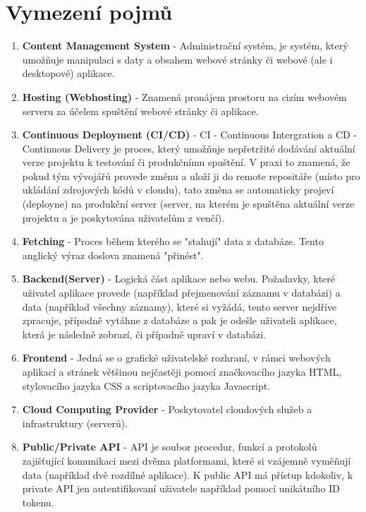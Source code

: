\documentclass[12pt,a4paper]{report}
\begin{document}
  \clearpage
  
  \tableofcontents
  
  \clearpage

  \chapter{Vymezení pojmů}
  \begin{enumerate}
    \item \textbf{Content Management System} - Administrační systém, je systém, který umožňuje manipulaci s daty a obsahem webové stránky či webové (ale i desktopové) aplikace. 
    \item \textbf{Hosting (Webhosting)} - Znamená pronájem prostoru na cizím webovém serveru za účelem spuštění webové stránky či aplikace. 
    \item \textbf{Continuous Deployment (CI/CD)} - CI - Continuous Intergration a CD - Continuous Delivery je proces, který umožňuje nepřetržité dodávání aktuální verze projektu k testování či produkčnímu spuštění. V praxi to znamená, že pokud tým vývojářů provede změnu a uloží ji do remote repositáře (místo pro ukládání zdrojových kódů v cloudu), tato změna se automaticky projeví (deployne) na produkční server (server, na kterém je spuštěna aktuální verze projektu a je poskytována uživatelům z venčí).
    \item \textbf{Fetching} - Proces během kterého se "stahují" data z databáze. Tento anglický výraz doslova znamená "přinést".
    \item \textbf{Backend(Server)} -  Logická část aplikace nebo webu. Požadavky, které uživatel aplikace provede (například přejmenování záznamu v databázi) a data (například všechny záznamy), které si vyžádá, tento server nejdříve zpracuje, případně vytáhne z databáze a pak je odešle uživateli aplikace, která je následně zobrazí, či případně upraví v databázi.
    \item \textbf{Frontend} - Jedná se o grafické uživatelské rozhraní, v rámci webových aplikací a stránek většinou nejčastěji pomocí značkovacího jazyka HTML, stylovacího jazyka CSS a scriptovacího jazyka Javascript.
    \item \textbf{Cloud Computing Provider} - Poskytovatel cloudových služeb a infrastruktury (serverů).
    \item \textbf{Public/Private API} - API je soubor procedur, funkcí a protokolů zajišťující komunikaci mezi dvěma platformami, které si vzájemně vyměňují data (například dvě rozdílné aplikace). K public API má přístup kdokoliv, k private API jen autentifikovaní uživatele například pomocí unikátního ID tokenu.

\end{enumerate}
\end{document}
